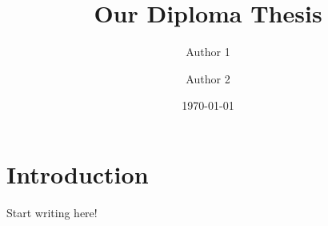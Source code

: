 \documentclass{article}
\title{Our Diploma Thesis}
\author{Author 1 \and Author 2}
\date{\today}
\begin{document}
\maketitle

\section{Introduction}
Start writing here!
\end{document}
